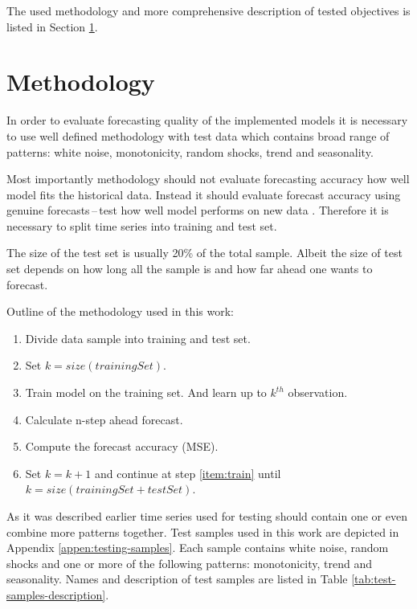 The used methodology and more comprehensive description of tested objectives is listed in Section \ref{sec:methodology}.

    \section{Methodology} \label{sec:methodology}
    In order to evaluate forecasting quality of the implemented models it is necessary to use well defined
    methodology with test data which contains broad range of patterns: white noise, monotonicity, random
    shocks, trend and seasonality.

    Most importantly methodology should not evaluate forecasting accuracy how well model
    fits the historical data. Instead it should evaluate forecast accuracy using genuine forecasts\,--\,test 
    how well model performs on new data \cite{otexts}. Therefore it is necessary to split time series into training
    and test set.

    The size of the test set is usually 20\% of the total sample. Albeit the size of test set depends on how
    long all the sample is and how far ahead one wants to forecast.

    Outline of the methodology used in this work:
    \begin{enumerate} \label{enum:methodology}
        \item Divide data sample into training and test set.
        \item Set $k = size(trainingSet)$.
        \item Train model on the training set. And learn up to $k^{th}$ observation. \label{item:train}
        \item Calculate n-step ahead forecast.
        \item Compute the forecast accuracy (MSE).
        \item Set $k = k+1$ and continue at step \ref{item:train} until $k=size(trainingSet + testSet)$.
    \end{enumerate}

    As it was described earlier time series used for testing should contain one or even combine more patterns together.
    Test samples used in this work are depicted in Appendix \ref{appen:testing-samples}. Each sample contains white
    noise, random shocks and one or more of the following patterns: monotonicity, trend and seasonality. Names and
    description of test samples are listed in Table \ref{tab:test-samples-description}.

